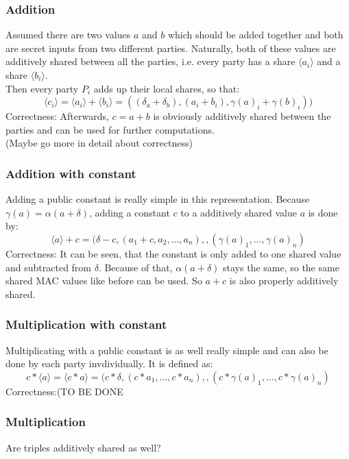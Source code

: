 \documentclass[english,runningheads,a4paper]{llncs}[2018/03/10]
\begin{document}
\subsubsection{Addition}
Assumed there are two values \( a\) and \( b\) which should be added together and both are secret inputs from two different parties. Naturally, both of these values are additively shared between all the parties, i.e. every party has a share \( \langle a_i\rangle\) and a share \( \langle b_i\rangle\).\\

Then every party \( P_i\) adds up their local shares, so that:\\
$$\langle c_i\rangle=\langle a_i\rangle+\langle b_i\rangle=((\delta_a+\delta_b),(a_i+b_i),\gamma (a)_i+\gamma (b)_i))$$
Correctness: Afterwards, \( c=a+b\) is obviously additively shared between the parties and can be used for further computations.\\

(Maybe go more in detail about correctness)


\subsubsection{Addition with constant}
Adding a public constant is really simple in this representation. Because \( \gamma (a)=\alpha(a+\delta)\), adding a constant \(c\) to a additively shared value \(a\) is done by:\\
$$\langle a\rangle+c=(\delta-c,(a_1+c,a_2,...,a_n),,(\gamma (a)_1,...,\gamma (a)_n)$$
Correctness: It can be seen, that the constant is only added to one shared value and subtracted from \( \delta\). Because of that, \( \alpha(a+\delta)\) stays the same, so the same shared MAC values like before can be used. So \(a+c\) is also properly additively shared.\\

\subsubsection{Multiplication with constant}
Multiplicating with a public constant is as well really simple and can also be done by each party invdividually. It is defined as:\\
$$c*\langle a\rangle=\langle c*a\rangle=(c*\delta,(c*a_1,...,c*a_n),,(c*\gamma (a)_1,...,c*\gamma (a)_n)$$
Correctness:(TO BE DONE\\

\subsubsection{Multiplication}
Are triples additively shared as well?
\end{document}
